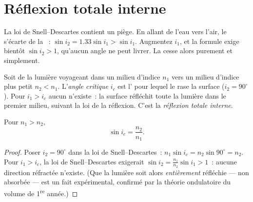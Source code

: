 \section{Réflexion totale interne}

La loi de Snell--Descartes contient un piège. En allant de
l'eau vers l'air, le  s'écarte de la
~: $\sin i_2 = 1.33 \sin i_1 > \sin i_1$. Augmentez
$i_1$, et la formule exige bientôt $\sin i_2 > 1$, qu'aucun angle ne
peut livrer. La  cesse alors purement et simplement.

\begin{definition}\label{def:g10:refraction:critical}
Soit de la lumière voyageant dans un milieu d'indice $n_1$ vers un
milieu d'indice plus petit $n_2 < n_1$. L'\emph{angle
critique} $i_c$ est l' pour
lequel le  rase la surface ($i_2 = 90^\circ$).
Pour $i_1 > i_c$ aucun  n'existe~: la surface
réfléchit toute la lumière dans le premier milieu, suivant la loi de la
réflexion. C'est la \emph{réflexion totale interne}.
\end{definition}

\begin{proposition}\label{prop:g10:refraction:criticalformula}
Pour $n_1 > n_2$,
\[
\sin i_c = \frac{n_2}{n_1} .
\]
\end{proposition}

\begin{proof}
Poser $i_2 = 90^\circ$ dans la loi de Snell--Descartes~:
$n_1 \sin i_c = n_2 \sin 90^\circ = n_2$. Pour $i_1 > i_c$, la
loi de Snell--Descartes exigerait
$\sin i_2 = \frac{n_1}{n_2}\sin i_1 > 1$~: aucune direction réfractée
n'existe. (Que la lumière soit alors \emph{entièrement} réfléchie ---
non absorbée --- est un fait expérimental, confirmé par la théorie
ondulatoire du volume de 1\textsuperscript{re} année.)
\end{proof}

